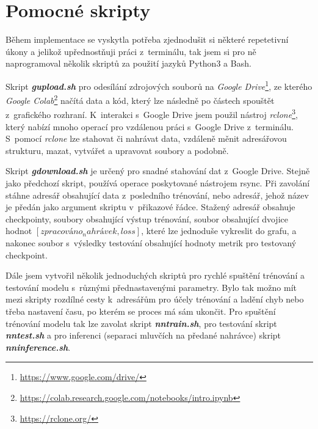 %
%


\section{Pomocné skripty}
Během implementace se vyskytla potřeba zjednodušit si některé repetetivní úkony a jelikož upřednostňuji práci z~terminálu, tak jsem si pro ně naprogramoval několik skriptů za použití jazyků Python3 a Bash. 

Skript \textbf{\textit{gupload.sh}} pro odesílání zdrojových souborů na \textit{Google Drive}\footnote{\url{https://www.google.com/drive/}}, ze kterého \textit{Google Colab}\footnote{\url{https://colab.research.google.com/notebooks/intro.ipynb}} načítá data a kód, který lze následně po částech spouštět z~grafického rozhraní. K~interakci s~Google Drive jsem použil nástroj \textit{rclone}\footnote{\url{https://rclone.org/}}, který nabízí mnoho operací pro vzdálenou práci s~Google Drive z~terminálu. S~pomocí \textit{rclone} lze stahovat či nahrávat data, vzdáleně měnit adresářovou strukturu, mazat, vytvářet a upravovat soubory a podobně. 

Skript \textbf{\textit{gdownload.sh}} je určený pro snadné stahování dat z~Google Drive. Stejně jako předchozí skript, používá operace poskytované nástrojem rsync. Při zavolání stáhne adresář obsahující data z~posledního trénování, nebo adresář, jehož název je předán jako argument skriptu v~přikazové řádce.   
Stažený adresář obsahuje checkpointy, soubory obsahující výstup trénování, soubor obsahující dvojice hodnot $[zpracováno_nahrávek, loss]$, které lze jednoduše vykreslit do grafu, a nakonec soubor s~výsledky testování obsahující hodnoty metrik pro testovaný checkpoint.

Dále jsem vytvořil několik jednoduchých skriptů pro rychlé spuštění trénování a testování modelu s~různými přednastavenými parametry. Bylo tak možno mít mezi skripty rozdílné cesty k~adresářům pro účely trénování a ladění chyb nebo třeba nastavení času, po kterém se proces má sám ukončit. Pro spuštění trénování modelu tak lze zavolat skript \textbf{\textit{nntrain.sh}}, pro testování skript \textbf{\textit{nntest.sh}} a pro inferenci (separaci mluvčích na předané nahrávce) skript \textbf{\textit{nninference.sh}}.


